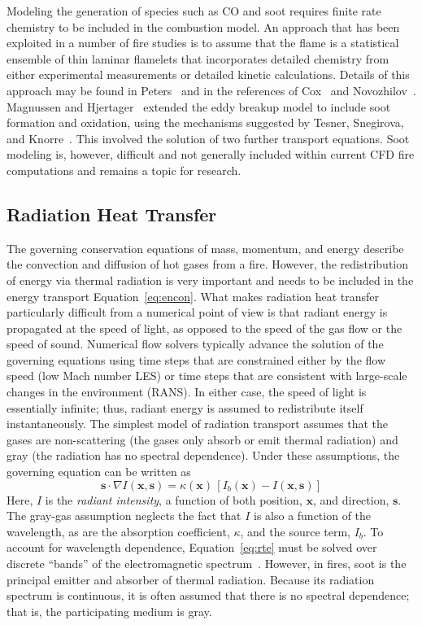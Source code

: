 \documentclass[graybox]{svmult}
\begin{document}
Modeling the generation of species such as CO and soot requires finite rate chemistry to be included in the combustion model. An approach that has been exploited in a number of fire studies is to assume that the flame is a statistical ensemble of thin laminar flamelets that incorporates detailed chemistry from either experimental measurements or detailed kinetic calculations. Details of this approach may be found in Peters~\cite{Peters} and in the references of Cox~\cite{Cox:1998} and Novozhilov~\cite{Novozhilov}. Magnussen and Hjertager~\cite{Magnussen} extended the eddy breakup model to include soot formation and oxidation, using the mechanisms suggested by Tesner, Snegirova, and Knorre~\cite{Tesner}. This involved the solution of two further transport equations. Soot modeling is, however, difficult and not generally included within current CFD fire computations and remains a topic for research.


\subsection{Radiation Heat Transfer}

The governing conservation equations of mass, momentum, and energy describe the convection and diffusion of hot gases from a fire. However, the redistribution of energy via thermal radiation is very important and needs to be included in the energy transport Equation~\ref{eq:encon}. What makes radiation heat transfer particularly difficult from a numerical point of view is that radiant energy is propagated at the speed of light, as opposed to the speed of the gas flow or the speed of sound. Numerical flow solvers typically advance the solution of the governing
equations using time steps that are constrained either by the flow speed (low Mach number LES) or time steps that are consistent with large-scale changes in the environment (RANS). In either case, the speed of light is essentially infinite; thus, radiant energy is assumed to redistribute itself instantaneously. The simplest model of radiation transport assumes that the gases are non-scattering (the gases only absorb or emit thermal radiation) and gray (the radiation has no spectral dependence). Under these assumptions, the governing equation can be written as
\begin{equation}
\mathbf{s} \cdot \nabla I(\mathbf{x},\mathbf{s}) = \kappa(\mathbf{x}) \, \left[ I_b(\mathbf{x}) - I(\mathbf{x},\mathbf{s}) \right]
\label{eq:rte}
\end{equation}
Here, $I$ is the {\em radiant intensity}, a function of both position, $\mathbf{x}$, and direction, $\mathbf{s}$. The gray-gas assumption neglects the fact that $I$ is also a function of the wavelength, as are the absorption coefficient, $\kappa$, and the source term, $I_b$. To account for wavelength dependence, Equation~\ref{eq:rte} must be solved over discrete ``bands'' of the electromagnetic spectrum~\cite{Siegel}. However, in fires, soot is the principal emitter and absorber of thermal radiation. Because its radiation spectrum is continuous, it is often assumed that there is no spectral dependence; that is, the participating medium is gray.
\end{document}
